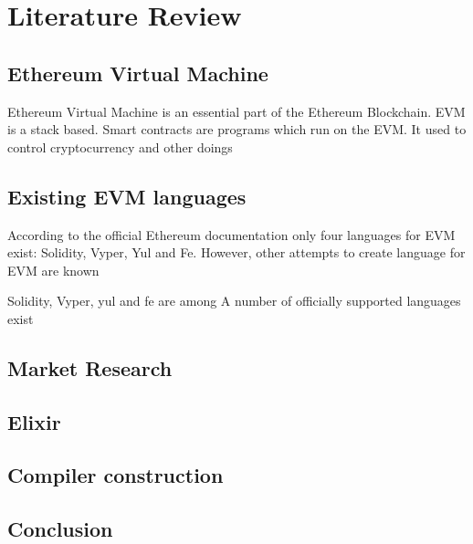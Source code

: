 \chapter{Literature Review}
\label{chap:lr}




\section{Ethereum Virtual Machine}
Ethereum Virtual Machine is an essential part of the Ethereum Blockchain. EVM is a stack based. Smart contracts are programs which run on the EVM. It used to control cryptocurrency and other doings

\section{Existing EVM languages}
According to the official Ethereum documentation \cite{OfficialEthereumLanguages} only four languages for EVM exist: Solidity, Vyper, Yul and Fe. However, other attempts to create language for EVM are known \cite{CommunityEthereumLanguages}

Solidity, Vyper, yul and fe are among  A number of officially supported languages exist 
\section{Market Research}
\section{Elixir}
\section{Compiler construction}
\section{Conclusion}
\newpage


